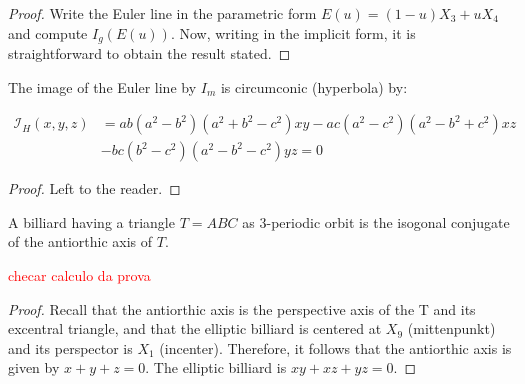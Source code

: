 	\begin{proof} Write the Euler line in the parametric form $E(u)=(1-u)X_3+uX_4$ and compute $I_g(E(u))$. Now, writing in the implicit form, it is straightforward to obtain the result stated.
	\end{proof}
	
		\begin{proposition} The image of the Euler line by $I_m$ is circumconic (hyperbola)  by:
	
	\begin{align*}
\mathcal{I}_H(x,y,z)&= a b (a^2 - b^2) (a^2 + b^2 - c^2) x y - a c (a^2 - c^2) (a^2 - b^2 + c^2) x z \\
&- b c (b^2 - c^2) (a^2 - b^2 - c^2)y z=0
	\end{align*}
	
	\end{proposition}
	
	\begin{proof}
	Left to the reader.
	\end{proof}
	
	\begin{proposition} A   billiard  having a triangle $T=ABC$ as 3-periodic orbit is the isogonal conjugate of the antiorthic axis of $T$.
 \label{prop:appA-billiard-antiorthic}
	\end{proposition}
	\textcolor{red}{checar calculo da prova}
	\begin{proof}
	Recall that the antiorthic axis  is the perspective axis of the T and its excentral triangle, and that the elliptic billiard is centered at $X_9$ (mittenpunkt) and its perspector is   $X_1$ (incenter).
	Therefore, it follows that the antiorthic axis is given by $x+y+z=0$.
The elliptic billiard is $xy+xz+yz=0$.
	\end{proof}
	
%	
